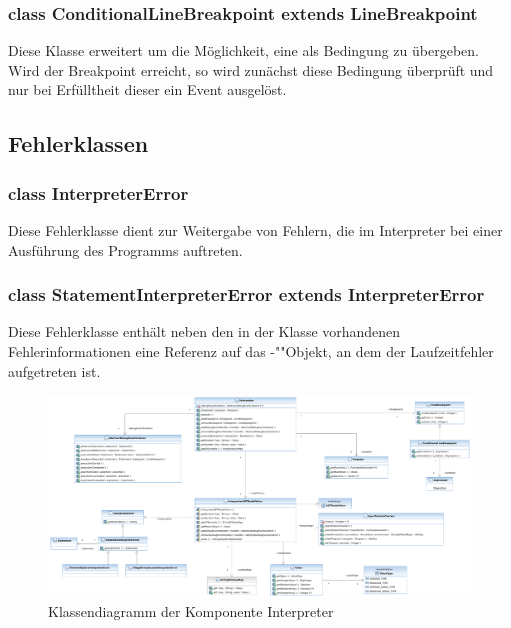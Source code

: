 \subsubsection{class ConditionalLineBreakpoint extends LineBreakpoint}
Diese Klasse erweitert  um die Möglichkeit, eine  als Bedingung zu übergeben. Wird der Breakpoint erreicht, so wird zunächst diese Bedingung überprüft und nur bei Erfülltheit dieser ein Event ausgelöst.

\subsection{Fehlerklassen}
\subsubsection{class InterpreterError}
Diese Fehlerklasse dient zur Weitergabe von Fehlern, die im Interpreter bei einer Ausführung des Programms auftreten.

\subsubsection{class StatementInterpreterError extends InterpreterError}
Diese Fehlerklasse enthält neben den in der Klasse  vorhandenen Fehlerinformationen eine Referenz auf das -""Objekt, an dem der Laufzeitfehler aufgetreten ist.

\begin{landscape}%
    \begin{figure}%
        \vspace{-15mm}
        \includegraphics[width=250mm]{diagrams/interpreter_component.pdf}

        \caption{Klassendiagramm der Komponente Interpreter}

    \end{figure}%
\end{landscape}%

